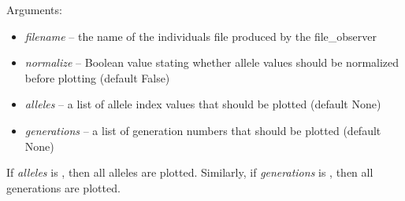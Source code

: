 \documentclass[letterpaper,10pt,english]{sphinxmanual}
\begin{document}
\begin{fulllineitems}
Arguments:
\begin{itemize}
\item {} 
\emph{filename} -- the name of the individuals file produced by the file\_observer

\item {} 
\emph{normalize} -- Boolean value stating whether allele values should be
normalized before plotting (default False)

\item {} 
\emph{alleles} -- a list of allele index values that should be plotted
(default None)

\item {} 
\emph{generations} -- a list of generation numbers that should be plotted
(default None)

\end{itemize}

If \emph{alleles} is , then all alleles are plotted. Similarly, if 
\emph{generations} is , then all generations are plotted.

\end{fulllineitems}

\end{document}
